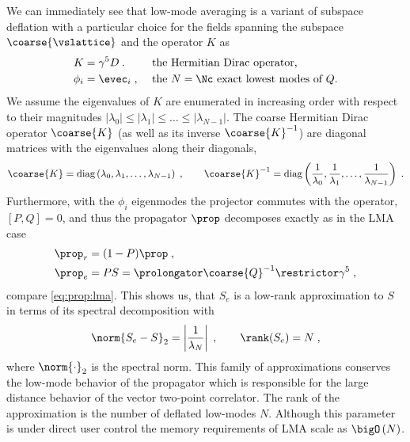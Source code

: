We can immediately see that low-mode averaging is a variant of subspace deflation with a particular choice for the fields spanning the subspace $\coarse{\vslattice}$ and the operator $K$ as
\begin{align}
K &= \gamma^{5} D \:.  &  &\text{ the Hermitian Dirac operator,} \\
\phi_i &= \evec_i \;,  &  &\text{ the $N=\Nc$ exact lowest modes of $Q$.}
\end{align}
We assume the eigenvalues of $K$ are enumerated in increasing order with respect to their magnitudes $\lvert \lambda_0 \rvert \leq \lvert \lambda_1 \rvert \leq \ldots \leq \lvert \lambda_{N-1} \rvert$.
The coarse Hermitian Dirac operator $\coarse{K}$ (as well as its inverse $\coarse{K}^{-1}$) are diagonal matrices with the eigenvalues along their diagonals,
\begin{equation} \label{eq:sd:lma:diagonal:dirac}
\coarse{K} = \text{diag}\left(\lambda_0, \lambda_1, \ldots, \lambda_{N-1}\right) \;,
\qquad
\coarse{K}^{-1} = \text{diag}\left(\frac{1}{\lambda_0}, \frac{1}{\lambda_1}, \ldots, \frac{1}{\lambda_{N-1}}\right) \;.
\end{equation}
Furthermore, with the $\phi_i$ eigenmodes the projector commutes with the operator, $[P,Q]=0$, and thus the propagator $\prop$ decomposes exactly as in the LMA case
\begin{align}
\prop_{r} &= (1-P) \prop \;, \\
\prop_{e} &= PS = \prolongator \coarse{Q}^{-1} \restrictor \gamma^5 \;,
\end{align}
compare \cref{eq:prop:lma}.
This shows us, that $S_e$ is a low-rank approximation to $S$ in terms of its spectral decomposition with
\begin{equation}
\norm{S_e - S}_2
 = \left\lvert \frac{1}{\lambda_{N}} \right\rvert \;,
\qquad
\rank(S_e) = N \;,
\end{equation}
where $\norm{\cdot}_2$ is the spectral norm.
This family of approximations conserves the low-mode behavior of the propagator which is responsible for the large distance behavior of the vector two-point correlator.
The rank of the approximation is the number of deflated low-modes $N$.
Although this parameter is under direct user control the memory requirements of LMA scale as $\bigO\left( N \right)$.

